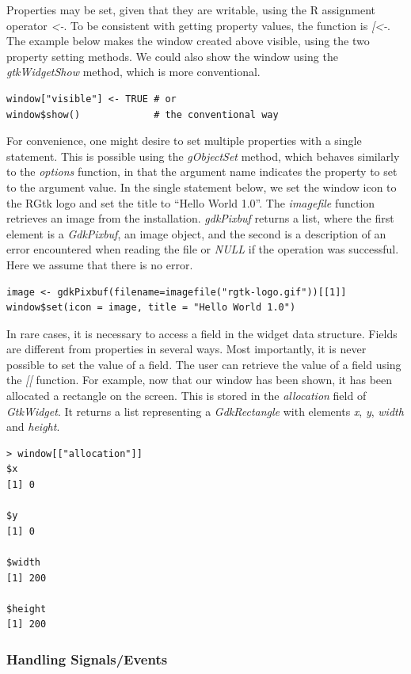 \documentclass[article]{jss}
\begin{document}
Properties may be set, given that they are writable, using the R assignment 
operator \emph{<-}. To be consistent with getting property values, the function
is \emph{[<-}. The example below makes the window created above visible, using the two
property setting methods. We could also show the window using the 
\emph{gtkWidgetShow} method, which is more conventional.
\begin{verbatim}
window["visible"] <- TRUE # or
window$show()             # the conventional way
\end{verbatim}

For convenience, one might desire to set multiple properties with a single statement.
This is possible using the \emph{gObjectSet} method, which behaves similarly
to the  \emph{options} function, in that the argument name indicates
the property to set to the argument value. In the single statement below, we 
set the window icon to the RGtk logo and set the title to ``Hello World 1.0''. 
The \emph{imagefile} function retrieves an image from the  installation.
\emph{gdkPixbuf} returns a list, where the first element is a \emph{GdkPixbuf}, an image object,
and the second is a description of an error encountered when reading the file
or \emph{NULL} if the operation was successful. Here we assume that there is no error.
\begin{verbatim}
image <- gdkPixbuf(filename=imagefile("rgtk-logo.gif"))[[1]]
window$set(icon = image, title = "Hello World 1.0")
\end{verbatim}

In rare cases, it is necessary to access a field in the widget data structure.
Fields are different from properties in several ways. Most importantly, it is
never possible to set the value of a field. The user can retrieve the value of
a field using the \emph{[[} function. For example, now that our window
has been shown, it has been allocated a rectangle on the screen. This is stored
in the \emph{allocation} field of \emph{GtkWidget}. It returns a list 
representing a \emph{GdkRectangle} with
elements \emph{x}, \emph{y}, \emph{width} and \emph{height}.
\begin{verbatim}
> window[["allocation"]]
$x
[1] 0

$y
[1] 0

$width
[1] 200

$height
[1] 200
\end{verbatim}

\subsubsection{Handling Signals/Events}
\end{document}
